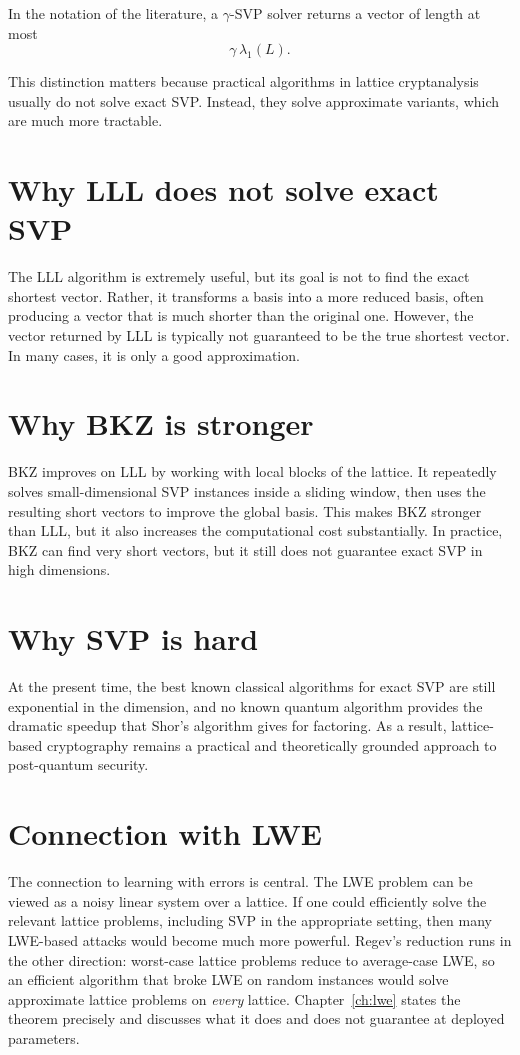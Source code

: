 In the notation of the literature, a $\gamma$-SVP solver returns a vector of length at most
\[
\gamma\,\lambda_1(L).
\]

This distinction matters because practical algorithms in lattice cryptanalysis usually do not solve exact SVP. Instead, they solve approximate variants, which are much more tractable.

\section{Why LLL does not solve exact SVP}

The LLL algorithm is extremely useful, but its goal is not to find the exact shortest vector. Rather, it transforms a basis into a more reduced basis, often producing a vector that is much shorter than the original one. However, the vector returned by LLL is typically not guaranteed to be the true shortest vector. In many cases, it is only a good approximation.

\section{Why BKZ is stronger}

BKZ improves on LLL by working with local blocks of the lattice. It repeatedly solves small-dimensional SVP instances inside a sliding window, then uses the resulting short vectors to improve the global basis. This makes BKZ stronger than LLL, but it also increases the computational cost substantially. In practice, BKZ can find very short vectors, but it still does not guarantee exact SVP in high dimensions.

\section{Why SVP is hard}

At the present time, the best known classical algorithms for exact SVP are still exponential in the dimension, and no known quantum algorithm provides the dramatic speedup that Shor's algorithm gives for factoring. As a result, lattice-based cryptography remains a practical and theoretically grounded approach to post-quantum security.

\section{Connection with LWE}

The connection to learning with errors is central. The LWE problem can be viewed as a noisy linear system over a lattice. If one could efficiently solve the relevant lattice problems, including SVP in the appropriate setting, then many LWE-based attacks would become much more powerful. Regev's reduction runs in the other direction: worst-case lattice problems reduce to average-case LWE, so an efficient algorithm that broke LWE on random instances would solve approximate lattice problems on \emph{every} lattice. Chapter~\ref{ch:lwe} states the theorem precisely and discusses what it does and does not guarantee at deployed parameters.

